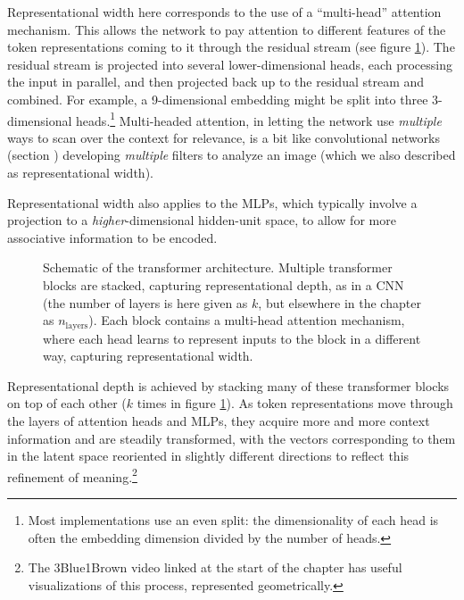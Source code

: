 Representational width here corresponds to the use of a
``multi-head'' attention mechanism. This allows the network to pay attention to
different features of the token representations coming to it through the
residual stream (see figure \ref{multipleHeads}). The residual stream is projected into several lower-dimensional heads, each processing the input in parallel, and then projected back up to the residual stream and combined. For example, a 9-dimensional embedding might be split into three 3-dimensional heads.\footnote{Most implementations use an even split: the dimensionality of each head is often the embedding dimension divided by the number of heads.}
Multi-headed attention, in letting the
network use \emph{multiple} ways to scan over the context for relevance, is a
bit like convolutional networks (section )
developing \emph{multiple} filters to analyze an image (which we also described as
representational width).

Representational width also applies to the MLPs, which typically involve a projection to a \emph{higher}-dimensional hidden-unit space, to allow for more associative information to be encoded.

\begin{figure}[ht]
\centering
{}
\caption[Jeff Yoshimi with consultation from Tim Meyer.]{Schematic of the
transformer architecture. Multiple transformer blocks are stacked, capturing
representational depth, as in a CNN (the number of layers is here given as $k$, but elsewhere in the chapter as $n_{\mbox{layers}}$). Each block contains a multi-head attention
mechanism, where each head learns to represent inputs to the block in a
different way, capturing representational width.}
\label{multipleHeads}
\end{figure}

Representational depth is achieved by stacking many of these
transformer blocks on top of each other ($k$ times in figure
\ref{multipleHeads}). As token representations move
through the layers of attention heads and MLPs, they acquire more and more
context information and are steadily transformed, with the vectors
corresponding to them in the latent space reoriented in slightly different
directions to reflect this refinement of meaning.\footnote{The 3Blue1Brown
video linked at the start of the chapter has useful visualizations of this
process, represented geometrically.}

